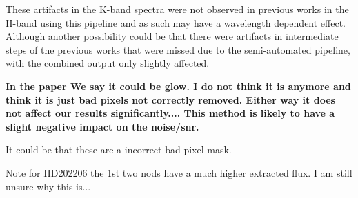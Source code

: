 These artifacts in the K-band spectra were not observed in previous works in the H-band using this pipeline and as such may have a wavelength dependent effect. Although another possibility could be that there were artifacts in intermediate steps of the previous works that were missed due to the semi-automated pipeline, with the combined output only slightly affected. 


\textbf{In the paper We say it could be glow. I do not think it is anymore and think it is just bad pixels not correctly removed. Either way it does not affect our results significantly....
This method is likely to have a slight negative impact on the noise/snr.}

It could be that these are a incorrect bad pixel mask.


Note for HD202206 the 1st two nods have a much higher extracted flux. I am still unsure why this is...

